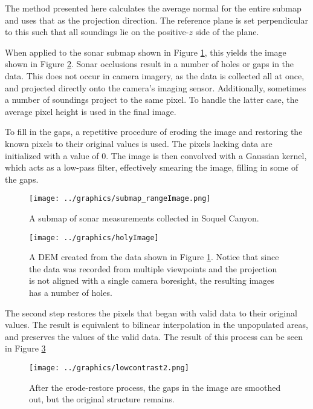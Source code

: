 The method presented here calculates the average normal for the entire submap and uses that as the projection direction. The reference plane is set perpendicular to this such that all soundings lie on the positive-$z$ side of the plane.

When applied to the sonar submap shown in Figure \ref{fig:submap_rangeImage}, this yields the image shown in Figure \ref{fig:holyImage}. Sonar occlusions result in a number of holes or gaps in the data. This does not occur in camera imagery, as the data is collected  all at once, and projected directly onto the camera's imaging sensor. Additionally, sometimes a number of soundings project to the same pixel. To handle the latter case, the average pixel height is used in the final image. 

To fill in the gaps, a repetitive procedure of eroding the image and restoring the known pixels to their original values is used. The pixels lacking data are initialized with a value of $0$. The image is then convolved with a Gaussian kernel, which acts as a low-pass filter, effectively smearing the image, filling in some of the gaps. 

\begin{figure}[htbp]
   \centering
   \texttt{[image: ../graphics/submap\_rangeImage.png]} %
   \caption{A submap of sonar measurements collected in Soquel Canyon.}
   \label{fig:submap_rangeImage}
\end{figure}

\begin{figure}[htbp]
   \centering
   \texttt{[image: ../graphics/holyImage]} %
   \caption{A DEM created from the data shown in Figure \ref{fig:submap_rangeImage}. Notice that since the data was recorded from multiple viewpoints and the projection is not aligned with a single camera boresight, the resulting images has a number of holes.}
   \label{fig:holyImage}
\end{figure}

The second step restores the pixels that began with valid data to their original values. The result is equivalent to bilinear interpolation in the unpopulated areas, and preserves the values of the valid data. The result of this process can be seen in Figure \ref{fig:rangeImage}

\begin{figure}[htbp]
   \centering
   \texttt{[image: ../graphics/lowcontrast2.png]} %
   \caption{After the erode-restore process, the gaps in the image are smoothed out, but the original structure remains.}
   \label{fig:rangeImage}
\end{figure}

